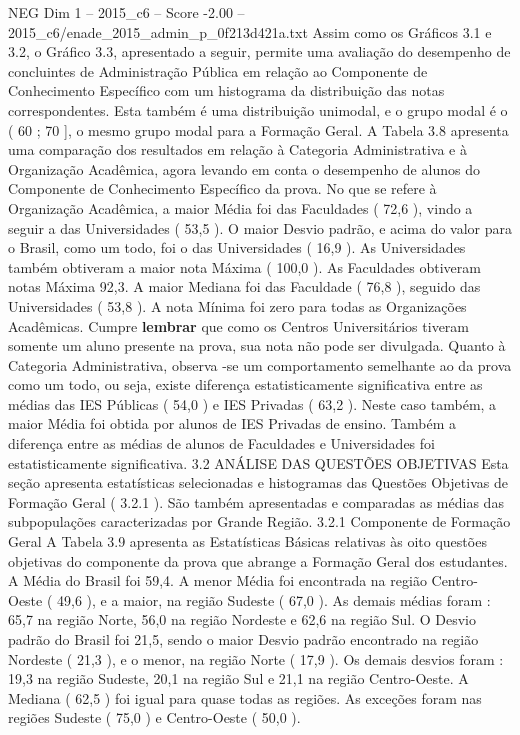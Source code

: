 \begin{textsample}{NEG Dim 1 – 2015\_c6 – Score -2.00 – 2015\_c6/enade\_2015\_admin\_p\_0f213d421a.txt}
Assim como os Gráficos 3.1 e 3.2, o Gráfico 3.3, apresentado a seguir, permite uma avaliação do desempenho de concluintes de Administração Pública em relação ao Componente de Conhecimento Específico com um histograma da distribuição das notas correspondentes.
Esta também é uma distribuição unimodal, e o grupo modal é o ( 60 ; 70 ], o mesmo grupo modal para a Formação Geral.
A Tabela 3.8 apresenta uma comparação dos resultados em relação à Categoria Administrativa e à Organização Acadêmica, agora levando em conta o desempenho de alunos do Componente de Conhecimento Específico da prova.
No que se refere à Organização Acadêmica, a maior Média foi das Faculdades ( 72,6 ), vindo a seguir a das Universidades ( 53,5 ).
O maior Desvio padrão, e acima do valor para o Brasil, como um todo, foi o das Universidades ( 16,9 ).
As Universidades também obtiveram a maior nota Máxima ( 100,0 ).
As Faculdades obtiveram notas Máxima 92,3.
A maior Mediana foi das Faculdade ( 76,8 ), seguido das Universidades ( 53,8 ).
A nota Mínima foi zero para todas as Organizações Acadêmicas.
Cumpre \textbf{lembrar} que como os Centros Universitários tiveram somente um aluno presente na prova, sua nota não pode ser divulgada.
Quanto à Categoria Administrativa, observa -se um comportamento semelhante ao da prova como um todo, ou seja, existe diferença estatisticamente significativa entre as médias das IES Públicas ( 54,0 ) e IES Privadas ( 63,2 ).
Neste caso também, a maior Média foi obtida por alunos de IES Privadas de ensino.
Também a diferença entre as médias de alunos de Faculdades e Universidades foi estatisticamente significativa. 3.2 ANÁLISE DAS QUESTÕES OBJETIVAS Esta seção apresenta estatísticas selecionadas e histogramas das Questões Objetivas de Formação Geral ( 3.2.1 ).
São também apresentadas e comparadas as médias das subpopulações caracterizadas por Grande Região. 3.2.1 Componente de Formação Geral A Tabela 3.9 apresenta as Estatísticas Básicas relativas às oito questões objetivas do componente da prova que abrange a Formação Geral dos estudantes.
A Média do Brasil foi 59,4.
A menor Média foi encontrada na região Centro-Oeste ( 49,6 ), e a maior, na região Sudeste ( 67,0 ).
As demais médias foram : 65,7 na região Norte, 56,0 na região Nordeste e 62,6 na região Sul.
O Desvio padrão do Brasil foi 21,5, sendo o maior Desvio padrão encontrado na região Nordeste ( 21,3 ), e o menor, na região Norte ( 17,9 ).
Os demais desvios foram : 19,3 na região Sudeste, 20,1 na região Sul e 21,1 na região Centro-Oeste.
A Mediana ( 62,5 ) foi igual para quase todas as regiões.
As exceções foram nas regiões Sudeste ( 75,0 ) e Centro-Oeste ( 50,0 ).

\end{textsample}
